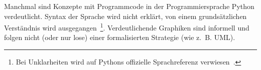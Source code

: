 \documentclass[12pt,a4paper,ngerman]{article}
\begin{document}
\bigskip

Manchmal sind Konzepte mit Programmcode in der Programmiersprache Python verdeutlicht.
Syntax der Sprache wird nicht erklärt, von einem grundsätzlichen Verständnis wird ausgegangen~\footnote{%
    Bei Unklarheiten wird auf Pythons offizielle Sprachreferenz verwiesen~\parencite{pythonLanguageReference}.
}.
Verdeutlichende Graphiken sind informell und folgen nicht (oder nur lose) einer formalisierten Strategie (wie z.~B. UML).


%


%

\end{document}
